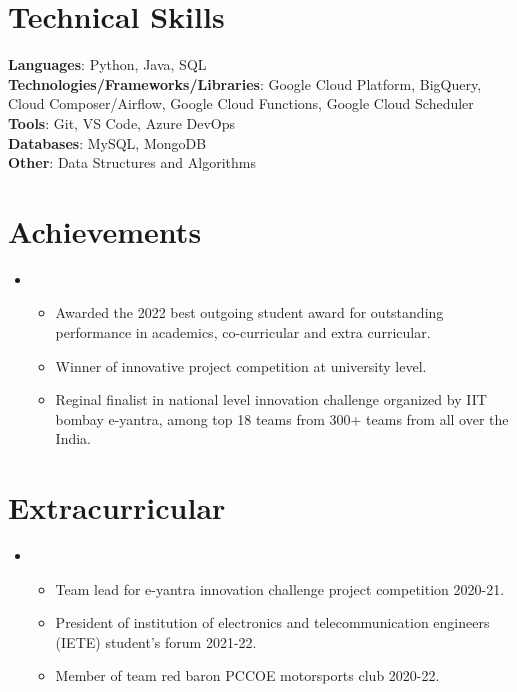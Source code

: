 \documentclass[letterpaper,11pt]{article}
\newcommand{\resumeItem}[1]{
  \item\small{
	{#1 \vspace{-2pt}}
  }
}
\newcommand{\resumeItemListStart}{\begin{itemize}}
\newcommand{\resumeItemListEnd}{\end{itemize}\vspace{-5pt}}
\begin{document}
\section{Technical Skills}
 \begin{itemize}[leftmargin=0.15in, label={}]
	\small{\item{
 	\textbf{Languages}{: Python, Java, SQL } \\
 	\textbf{Technologies/Frameworks/Libraries}{: Google Cloud Platform, BigQuery, Cloud Composer/Airflow, Google Cloud Functions, Google Cloud Scheduler } \\
 	\textbf{Tools}{: Git, VS Code, Azure DevOps } \\
 	\textbf{Databases}{: MySQL, MongoDB } \\
 	\textbf{Other}{: Data Structures and Algorithms } \\
	}}
 \end{itemize}
 \vspace{-16pt}


%
\section{Achievements}
\vspace{2pt}
 \begin{itemize}[leftmargin=0.15in, label={}]
 \item
	\resumeItemListStart
    	\resumeItem{Awarded the 2022 best outgoing student award for outstanding performance in academics, co-curricular and extra curricular.}
    	\resumeItem{Winner of innovative project competition at university level. }
    	\resumeItem{Reginal finalist in national level innovation challenge organized by IIT bombay e-yantra, among top 18 teams from 300+ teams from all over the India. }
  	\resumeItemListEnd
 \end{itemize}
 \vspace{-16pt}


%
\section{Extracurricular}
\vspace{2pt}
 \begin{itemize}[leftmargin=0.15in, label={}]
 \item
	\resumeItemListStart
    	\resumeItem {Team lead for e-yantra innovation challenge project competition 2020-21.}
    	\resumeItem {President of institution of electronics and telecommunication engineers (IETE) student's forum 2021-22.}
    	\resumeItem {Member of team red baron PCCOE motorsports club 2020-22.}
  	\resumeItemListEnd
 \end{itemize}
 \vspace{-16pt}
\end{document}
